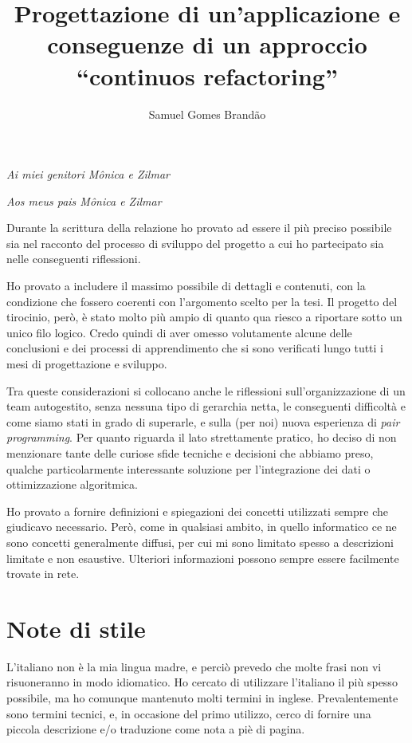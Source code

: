 \documentclass[12pt]{report}
\begin{document}
\renewcommand{\baselinestretch}{1.3}
\title{Progettazione di un'applicazione e conseguenze di un approccio
``continuos refactoring''}
\author{Samuel Gomes Brandão}

\beforepreface
{}
        {\hfill \Large {\sl Ai miei genitori Mônica e Zilmar}}

        {\hfill \Large {\sl Aos meus pais Mônica e Zilmar}}
% 
%

Durante la scrittura della relazione ho provato ad essere il più preciso 
possibile sia nel racconto del processo di sviluppo del progetto 
a cui ho partecipato sia nelle conseguenti riflessioni.

Ho provato a includere il massimo possibile di dettagli e contenuti, 
con la condizione che fossero coerenti con l'argomento scelto per 
la tesi. Il progetto del tirocinio, però, è stato molto più ampio di 
quanto qua riesco a riportare sotto un unico filo logico. 
Credo quindi di aver omesso volutamente alcune delle conclusioni e 
dei processi di apprendimento che si sono verificati lungo tutti 
i mesi di progettazione e sviluppo.

Tra queste considerazioni si collocano anche le riflessioni 
sull'organizzazione di 
un team autogestito, senza nessuna tipo di gerarchia netta, le 
conseguenti difficoltà e come siamo stati in grado di superarle, 
e sulla (per noi) nuova esperienza di \textit{pair programming}. 
Per quanto riguarda il lato strettamente pratico, 
ho deciso di non menzionare tante delle curiose sfide
tecniche e decisioni che abbiamo preso, qualche particolarmente 
interessante soluzione per l'integrazione dei dati o 
ottimizzazione algoritmica.

Ho provato a fornire definizioni e spiegazioni dei concetti utilizzati sempre
che giudicavo necessario. Però, come in qualsiasi ambito, in quello informatico 
ce ne sono concetti generalmente diffusi, per cui mi sono limitato spesso a
descrizioni limitate e non esaustive. Ulteriori informazioni possono sempre
essere facilmente trovate in rete.

\section*{Note di stile}
L'italiano non è la mia lingua madre, e perciò prevedo che molte frasi
non vi risuoneranno in modo idiomatico. Ho cercato di utilizzare l'italiano
il più spesso possibile, ma ho comunque mantenuto molti termini in inglese.
Prevalentemente sono termini tecnici, e, in occasione del primo utilizzo,
cerco di fornire una piccola descrizione e/o traduzione come nota a piè di
pagina.
\end{document}
